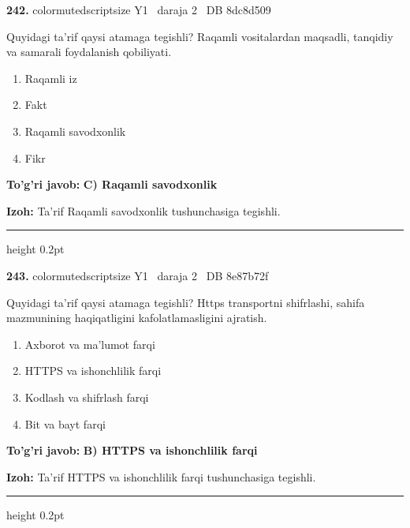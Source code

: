 \documentclass[10pt,a4paper,oneside]{article}
\begin{document}
\noindent\textbf{\color{ink}242.}  {color{muted}scriptsize Y1 \textbullet\ daraja 2 \textbullet\ DB 8dc8d509}
\par
Quyidagi ta'rif qaysi atamaga tegishli? Raqamli vositalardan maqsadli, tanqidiy va samarali foydalanish qobiliyati.
\begin{enumerate}[label=\Alph*),leftmargin=9mm]
\item Raqamli iz
\item Fakt
\item Raqamli savodxonlik
\item Fikr
\end{enumerate}
\begin{tcolorbox}[enhanced,breakable,colback=teal!4,colframe=teal!50!black,boxrule=0.5pt,arc=1.1mm,left=3mm,right=3mm,top=1.7mm,bottom=1.7mm,before skip=2mm,after skip=2mm]
\textbf{\color{teal}To'g'ri javob:} \textbf{C) Raqamli savodxonlik}
\par\smallskip
\textbf{Izoh:} Ta'rif Raqamli savodxonlik tushunchasiga tegishli.
\end{tcolorbox}
\vspace{2mm}\hrule height 0.2pt \vspace{3mm}

\noindent\textbf{\color{ink}243.}  {color{muted}scriptsize Y1 \textbullet\ daraja 2 \textbullet\ DB 8e87b72f}
\par
Quyidagi ta'rif qaysi atamaga tegishli? Https transportni shifrlashi, sahifa mazmunining haqiqatligini kafolatlamasligini ajratish.
\begin{enumerate}[label=\Alph*),leftmargin=9mm]
\item Axborot va ma'lumot farqi
\item HTTPS va ishonchlilik farqi
\item Kodlash va shifrlash farqi
\item Bit va bayt farqi
\end{enumerate}
\begin{tcolorbox}[enhanced,breakable,colback=teal!4,colframe=teal!50!black,boxrule=0.5pt,arc=1.1mm,left=3mm,right=3mm,top=1.7mm,bottom=1.7mm,before skip=2mm,after skip=2mm]
\textbf{\color{teal}To'g'ri javob:} \textbf{B) HTTPS va ishonchlilik farqi}
\par\smallskip
\textbf{Izoh:} Ta'rif HTTPS va ishonchlilik farqi tushunchasiga tegishli.
\end{tcolorbox}
\vspace{2mm}\hrule height 0.2pt \vspace{3mm}
\end{document}
